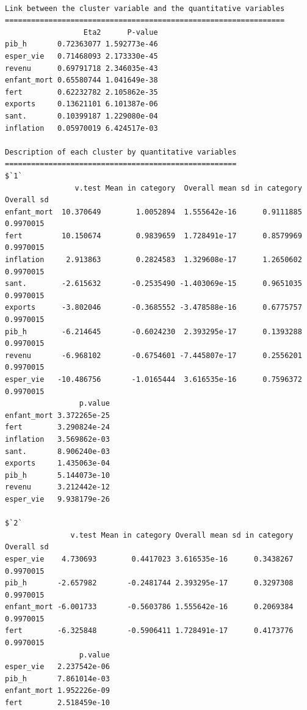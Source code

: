\documentclass[
]{article}
\newenvironment{Shaded}{}{}
\newcommand{\AttributeTok}[1]{#1}
\newcommand{\DecValTok}[1]{#1}
\newcommand{\FunctionTok}[1]{#1}
\newcommand{\NormalTok}[1]{#1}
\newcommand{\OtherTok}[1]{\textcolor[rgb]{1.00,0.25,0.00}{#1}}
\newcommand{\SpecialCharTok}[1]{\textcolor[rgb]{0.00,0.50,0.50}{#1}}
\begin{document}
\begin{Shaded}
\end{Shaded}

\begin{verbatim}

Link between the cluster variable and the quantitative variables
================================================================
                  Eta2      P-value
pib_h       0.72363077 1.592773e-46
esper_vie   0.71468093 2.173330e-45
revenu      0.69791718 2.346035e-43
enfant_mort 0.65580744 1.041649e-38
fert        0.62232782 2.105862e-35
exports     0.13621101 6.101387e-06
sant.       0.10399187 1.229080e-04
inflation   0.05970019 6.424517e-03

Description of each cluster by quantitative variables
=====================================================
$`1`
                v.test Mean in category  Overall mean sd in category Overall sd
enfant_mort  10.370649        1.0052894  1.555642e-16      0.9111885  0.9970015
fert         10.150674        0.9839659  1.728491e-17      0.8579969  0.9970015
inflation     2.913863        0.2824583  1.329608e-17      1.2650602  0.9970015
sant.        -2.615632       -0.2535490 -1.403069e-15      0.9651035  0.9970015
exports      -3.802046       -0.3685552 -3.478588e-16      0.6775757  0.9970015
pib_h        -6.214645       -0.6024230  2.393295e-17      0.1393288  0.9970015
revenu       -6.968102       -0.6754601 -7.445807e-17      0.2556201  0.9970015
esper_vie   -10.486756       -1.0165444  3.616535e-16      0.7596372  0.9970015
                 p.value
enfant_mort 3.372265e-25
fert        3.290824e-24
inflation   3.569862e-03
sant.       8.906240e-03
exports     1.435063e-04
pib_h       5.144073e-10
revenu      3.212442e-12
esper_vie   9.938179e-26

$`2`
               v.test Mean in category Overall mean sd in category Overall sd
esper_vie    4.730693        0.4417023 3.616535e-16      0.3438267  0.9970015
pib_h       -2.657982       -0.2481744 2.393295e-17      0.3297308  0.9970015
enfant_mort -6.001733       -0.5603786 1.555642e-16      0.2069384  0.9970015
fert        -6.325848       -0.5906411 1.728491e-17      0.4173776  0.9970015
                 p.value
esper_vie   2.237542e-06
pib_h       7.861014e-03
enfant_mort 1.952226e-09
fert        2.518459e-10


\end{verbatim}
\end{document}
